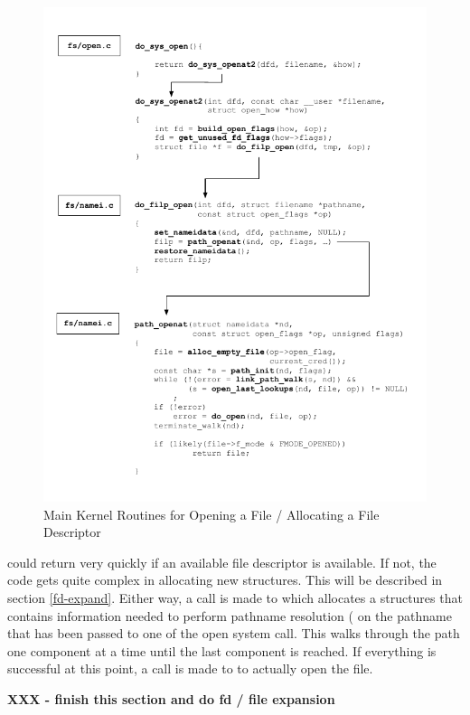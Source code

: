 \begin{figure}[h]
	\centering
	\includegraphics[scale=0.8]{figures/open-fd.pdf}
	\caption{Main Kernel Routines for Opening a File / Allocating a File Descriptor}
	\label{fig:open-fd-alloc}
\end{figure}

\noindent
  could return very quickly if an available file descriptor is available. If not, the code gets quite complex in allocating new structures. This will be described in section \ref{fd-expand}. Either way, a call is made to  which allocates a  structures that contains information needed to perform pathname resolution ( on the pathname that has been passed to one of the open system call. This walks through the path one component at a time until the last component is reached. If everything is successful at this point, a call is made to  to actually open the file.
 
 \textbf{XXX - finish this section and do fd / file expansion}
 
